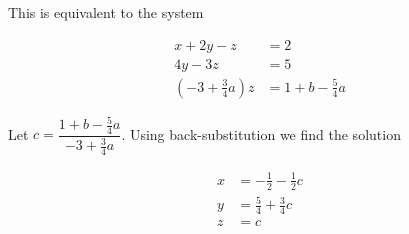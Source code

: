 \documentclass{article}
\begin{document}
\begin{enumerate}
This is equivalent to the system

\begin{align*}
 x + 2y - z &= 2 \\
 4y -3z &= 5 \\
 (-3 + \frac{3}{4}a)z &= 1 + b - \frac{5}{4}a
\end{align*}

Let $c = \dfrac{1 + b - \frac{5}{4}a}{-3 + \frac{3}{4}a}$.  Using back-substitution we find the solution

\begin{equation}\begin{aligned}
 x &= -\frac{1}{2} - \frac{1}{2}c \\
 y &= \frac{5}{4} + \frac{3}{4}c \\
 z &= c
\end{aligned}\label{q4:one}\end{equation}


\end{enumerate}
\end{document}
